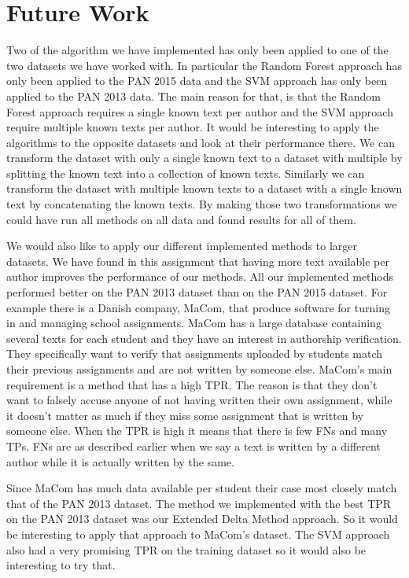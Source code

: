 \section{Future Work} \label{sec:future_work}

Two of the algorithm we have implemented has only been applied to one of the
two datasets we have worked with. In particular the Random Forest approach has
only been applied to the PAN 2015 data and the \gls{SVM} approach has only been
applied to the PAN 2013 data. The main reason for that, is that the Random
Forest approach requires a single known text per author and the \gls{SVM}
approach require multiple known texts per author. It would be interesting to
apply the algorithms to the opposite datasets and look at their performance
there. We can transform the dataset with only a single known text to a dataset
with multiple by splitting the known text into a collection of known texts.
Similarly we can transform the dataset with multiple known texts to a dataset
with a single known text by concatenating the known texts. By making those two
transformations we could have run all methods on all data and found results for
all of them.

We would also like to apply our different implemented methods to larger
datasets. We have found in this assignment that having more text available per
author improves the performance of our methods. All our implemented methods
performed better on the PAN 2013 dataset than on the PAN 2015 dataset. For
example there is a Danish company, MaCom, that produce software for turning in
and managing school assignments. MaCom has a large database containing several
texts for each student and they have an interest in authorship verification.
They specifically want to verify that assignments uploaded by students match
their previous assignments and are not written by someone else. MaCom's main
requirement is a method that has a high \gls{TPR}. The reason is that they
don't want to falsely accuse anyone of not having written their own assignment,
while it doesn't matter as much if they miss some assignment that is written by
someone else. When the \gls{TPR} is high it means that there is few \gls{FN}s
and many \gls{TP}s. \gls{FN}s are as described earlier when we say a text is
written by a different author while it is actually written by the same.

Since MaCom has much data available per student their case most closely match
that of the PAN 2013 dataset. The method we implemented with the best \gls{TPR}
on the PAN 2013 dataset was our Extended Delta Method approach. So it would be
interesting to apply that approach to MaCom's dataset. The \gls{SVM} approach
also had a very promising \gls{TPR} on the training dataset so it would also be
interesting to try that.
